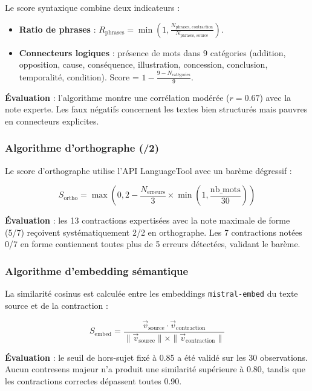 Le score syntaxique combine deux indicateurs :

\begin{itemize}
    \item \textbf{Ratio de phrases} : \(R_{\text{phrases}} = \min\left(1, \frac{N_{\text{phrases, contraction}}}{N_{\text{phrases, source}}}\right)\).
    \item \textbf{Connecteurs logiques} : présence de mots dans 9 catégories (addition, opposition, cause, conséquence, illustration, concession, conclusion, temporalité, condition). Score = \(1 - \frac{9 - N_{\text{catégories}}}{9}\).
\end{itemize}

\textbf{Évaluation} : l'algorithme montre une corrélation modérée (\(r = 0.67\)) avec la note experte. Les faux négatifs concernent les textes bien structurés mais pauvres en connecteurs explicites.

\subsubsection{Algorithme d'orthographe (/2)}

Le score d'orthographe utilise l'API LanguageTool avec un barème dégressif :

\[
S_{\text{ortho}} = \max\left(0, 2 - \frac{N_{\text{erreurs}}}{3}\times \min\left(1, \frac{\text{nb\_mots}}{30}\right)\right)
\]

\textbf{Évaluation} : les 13 contractions expertisées avec la note maximale de forme (5/7) reçoivent systématiquement 2/2 en orthographe. Les 7 contractions notées 0/7 en forme contiennent toutes plus de 5 erreurs détectées, validant le barème.

\subsubsection{Algorithme d'embedding sémantique}

La similarité cosinus est calculée entre les embeddings \texttt{mistral-embed} du texte source et de la contraction :

\[
S_{\text{embed}} = \frac{\vec{v}_{\text{source}} \cdot \vec{v}_{\text{contraction}}}{\|\vec{v}_{\text{source}}\| \times \|\vec{v}_{\text{contraction}}\|}
\]

\textbf{Évaluation} : le seuil de hors-sujet fixé à 0.85 a été validé sur les 30 observations. Aucun contresens majeur n'a produit une similarité supérieure à 0.80, tandis que les contractions correctes dépassent toutes 0.90.


